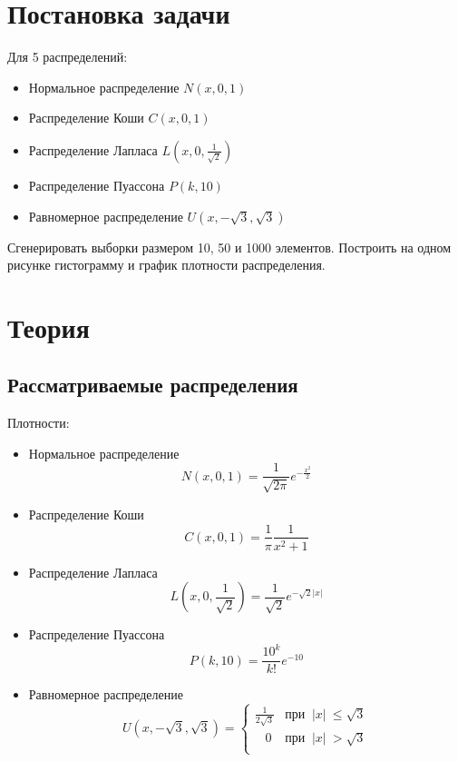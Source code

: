 \documentclass{article}
\begin{document}


\tableofcontents
{}
\newpage
\listoffigures
{}
\newpage

\section{Постановка задачи}
Для 5 распределений:
\begin{itemize}
    \item Нормальное распределение $N(x, 0, 1)$
    \item Распределение Коши $C(x, 0, 1)$
    \item Распределение Лапласа $L(x, 0, \frac{1}{\sqrt{2}})$
    \item Распределение Пуассона $P(k, 10)$
    \item Равномерное распределение $U(x,-\sqrt{3},\sqrt{3})$
\end{itemize}
Сгенерировать выборки размером 10, 50 и 1000 элементов. Построить на одном рисунке гистограмму и график плотности распределения.

\section{Теория}
\subsection{Рассматриваемые распределения}
Плотности:
\begin{itemize}
    \item Нормальное распределение
    \begin{equation}\label{norm}
        N(x,0,1)=\frac{1}{\sqrt{2\pi}}e^{-\frac{x^2}{2}}
    \end{equation}
    \item Распределение Коши
    \begin{equation}\label{cauchy}
        C(x, 0, 1)=\frac{1}{\pi}\frac{1}{x^2+1}
    \end{equation}
    \item Распределение Лапласа
    \begin{equation}\label{laplace}
        L(x,0,\frac{1}{\sqrt{2}})=\frac{1}{\sqrt{2}}e^{-\sqrt{2}|x|}
    \end{equation}
    \item Распределение Пуассона
    \begin{equation}\label{poisson}
        P(k, 10)=\frac{10^k}{k!}e^{-10}
    \end{equation}
    \item Равномерное распределение
    \begin{equation}\label{uniform}
        U(x,-\sqrt{3},\sqrt{3})=
        \begin{cases}
        \displaystyle\frac{1}{2\sqrt{3}}&\text{при}\;\;|x|\:\leq\sqrt{3}\\
        \;\;\;0&\text{при}\;\;|x|\:>\sqrt{3}\\
        \end{cases}
    \end{equation}
\end{itemize}
\end{document}
